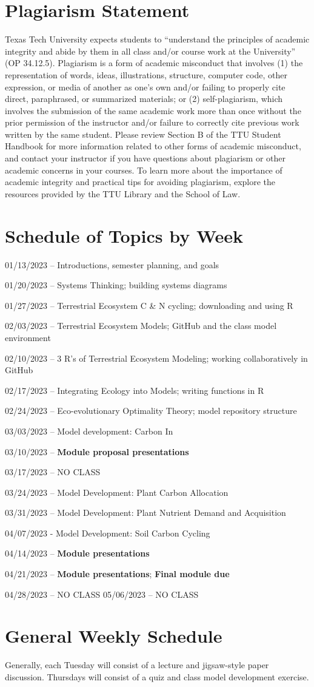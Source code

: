 \documentclass[12pt, notitlepage]{article}   	%
\begin{document}
{\section{Plagiarism Statement}
Texas Tech University expects students to “understand the principles of academic integrity 
and abide by them in all class and/or course work at the University” (OP 34.12.5). 
Plagiarism is a form of academic misconduct that involves (1) the representation of words, 
ideas, illustrations, structure, computer code, other expression, or media of another as 
one's own and/or failing to properly cite direct, paraphrased, or summarized materials; 
or (2) self-plagiarism, which involves the submission of the same academic work more than 
once without the prior permission of the instructor and/or failure to correctly cite 
previous work written by the same student. Please review Section B of the TTU 
Student Handbook for more information related to other forms of academic misconduct, 
and contact your instructor if you have questions about plagiarism or other 
academic concerns in your courses. To learn more about the importance of 
academic integrity and practical tips for avoiding plagiarism, explore the 
resources provided by the TTU Library and the School of Law.

\newpage

\section*{Schedule of Topics by Week}
01/13/2023 – Introductions, semester planning, and goals \par
01/20/2023 – Systems Thinking; building systems diagrams \par
01/27/2023 – Terrestrial Ecosystem C & N cycling; downloading and using R \par
02/03/2023 – Terrestrial Ecosystem Models; GitHub and the class model environment \par
02/10/2023 – 3 R's of Terrestrial Ecosystem Modeling; working collaboratively in GitHub \par
02/17/2023 – Integrating Ecology into Models; writing functions in R \par
02/24/2023 – Eco-evolutionary Optimality Theory; model repository structure \par
03/03/2023 – Model development: Carbon In \par
03/10/2023 – \textbf{Module proposal presentations} \par
03/17/2023 – NO CLASS \par
03/24/2023 – Model Development: Plant Carbon Allocation \par
03/31/2023 – Model Development: Plant Nutrient Demand and Acquisition \par
04/07/2023 - Model Development: Soil Carbon Cycling \par
04/14/2023 – \textbf{Module presentations} \par
04/21/2023 – \textbf{Module presentations}; \textbf{Final module due} \par
04/28/2023 – NO CLASS
05/06/2023 – NO CLASS

\section*{General Weekly Schedule}
Generally, each Tuesday will consist of a lecture and jigsaw-style paper discussion. Thursdays
will consist of a quiz and class model development exercise.

} %
\end{document}
